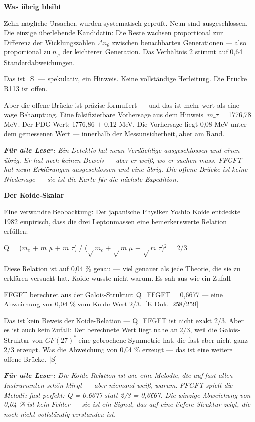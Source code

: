 \documentclass[11pt,oneside]{book}
\newcommand{\status}[1]{\penalty10000\,{\scriptsize\textcolor{gray!60}{[#1]}}}
\newenvironment{laierspur}{%
  \par\vspace{4pt}%
  \noindent\small\itshape\color{blue!60!black}%
  \textbf{Für alle Leser:}\enspace\ignorespaces}{%
  \par\vspace{4pt}\normalsize\normalfont\normalcolor}
\begin{document}
\textbf{Was übrig bleibt}


Zehn mögliche Ursachen wurden systematisch geprüft. Neun sind
ausgeschlossen. Die einzige überlebende Kandidatin: Die Reste wachsen
proportional zur Differenz der Wicklungszahlen $\Delta n_\theta$ zwischen
benachbarten Generationen — also proportional zu $n_\varphi$ der leichteren
Generation. Das Verhältnis 2 stimmt auf 0,64 Standardabweichungen.


Das ist \status{S} — spekulativ, ein Hinweis. Keine vollständige Herleitung.
Die Brücke R113 ist offen.


Aber die offene Brücke ist präzise formuliert — und das ist mehr wert
als eine vage Behauptung. Eine falsifizierbare Vorhersage aus dem
Hinweis: $m\_\tau$ = 1776,78 MeV. Der PDG-Wert: 1776,86 $\pm$ 0,12 MeV.
Die Vorhersage liegt 0,08 MeV unter dem gemessenen Wert — innerhalb
der Messunsicherheit, aber am Rand.


\begin{laierspur}
Ein Detektiv hat neun Verdächtige ausgeschlossen und einen
übrig. Er hat noch keinen Beweis — aber er weiß, wo er suchen muss.
FFGFT hat neun Erklärungen ausgeschlossen und eine übrig. Die offene
Brücke ist keine Niederlage — sie ist die Karte für die nächste Expedition.
\end{laierspur}

\textbf{Der Koide-Skalar}


Eine verwandte Beobachtung: Der japanische Physiker Yoshio Koide entdeckte
1982 empirisch, dass die drei Leptonmassen eine bemerkenswerte Relation
erfüllen:


Q = ($m_e$ + $m\_\mu$ + $m\_\tau$) / ($\sqrt{}m_e$ + $\sqrt{}m\_\mu$ + $\sqrt{}m\_\tau$)$^2$ = 2/3


Diese Relation ist auf 0,04 \% genau — viel genauer als jede Theorie,
die sie zu erklären versucht hat. Koide wusste nicht warum. Es sah aus
wie ein Zufall.


FFGFT berechnet aus der Galois-Struktur: Q\_FFGFT = 0,6677 — eine
Abweichung von 0,04 \% vom Koide-Wert 2/3. \status{K Dok.~258/259}


Das ist kein Beweis der Koide-Relation — Q\_FFGFT ist nicht exakt 2/3.
Aber es ist auch kein Zufall: Der berechnete Wert liegt nahe an 2/3,
weil die Galois-Struktur von $GF(27)^*$ eine gebrochene Symmetrie hat,
die fast-aber-nicht-ganz 2/3 erzeugt. Was die Abweichung von 0,04 \%
erzeugt — das ist eine weitere offene Brücke. \status{S}


\begin{laierspur}
Die Koide-Relation ist wie eine Melodie, die auf fast allen
Instrumenten schön klingt — aber niemand weiß, warum. FFGFT spielt die
Melodie fast perfekt: Q = 0,6677 statt 2/3 = 0,6667. Die winzige
Abweichung von 0,04 \% ist kein Fehler — sie ist ein Signal, das
auf eine tiefere Struktur zeigt, die noch nicht vollständig verstanden ist.
\end{laierspur}
\end{document}
